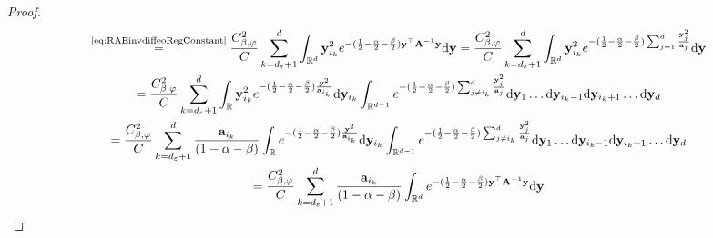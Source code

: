 \begin{proof}
\begin{multline}
        \overset{\text{\ref{eq:RAEinvdiffeoRegConstant}}}{=} \frac{\RAEdiffeoRegConstant}{\RAEnormalizationConstant} \sum_{\sumIndC=\dimInd_\RAErelerror+1}^{\dimInd} \int_{\Real^\dimInd} \VectorB_{\sumIndA_\sumIndC}^2 e^{-(\frac{1}{2} - \frac{\RAEboundParamB}{2} - \frac{\RAEboundParam}{2}) \VectorB^\top \spdMatrix^{-1} \VectorB} \mathrm{d} \VectorB = \frac{\RAEdiffeoRegConstant}{\RAEnormalizationConstant} \sum_{\sumIndC=\dimInd_\RAErelerror+1}^{\dimInd} \int_{\Real^\dimInd} \VectorB_{\sumIndA_\sumIndC}^2 e^{-(\frac{1}{2} - \frac{\RAEboundParamB}{2} - \frac{\RAEboundParam}{2}) \sum_{\sumIndB=1}^\dimInd  \frac{\VectorB_\sumIndB^2}{\spdMatrixDiag_{\sumIndB}} } \mathrm{d} \VectorB  \\
        = \frac{\RAEdiffeoRegConstant}{\RAEnormalizationConstant} \sum_{\sumIndC=\dimInd_\RAErelerror+1}^{\dimInd} \int_{\Real} \VectorB_{\sumIndA_\sumIndC}^2 e^{-(\frac{1}{2} - \frac{\RAEboundParamB}{2} - \frac{\RAEboundParam}{2})  \frac{\VectorB^2}{\spdMatrixDiag_{\sumIndA_\sumIndC}} } \mathrm{d} \VectorB_{\sumIndA_\sumIndC} \int_{\Real^{\dimInd-1}} e^{-(\frac{1}{2} - \frac{\RAEboundParamB}{2} - \frac{\RAEboundParam}{2}) \sum_{\sumIndB\neq \sumIndA_\sumIndC}^\dimInd  \frac{\VectorB_\sumIndB^2}{\spdMatrixDiag_{\sumIndB}} } \mathrm{d} \VectorB_{1} \ldots \mathrm{d} \VectorB_{\sumIndA_\sumIndC -1} \mathrm{d} \VectorB_{\sumIndA_\sumIndC +1} \ldots \mathrm{d} \VectorB_{\dimInd}\\
        = \frac{\RAEdiffeoRegConstant}{\RAEnormalizationConstant} \sum_{\sumIndC=\dimInd_\RAErelerror+1}^{\dimInd} \frac{\spdMatrixDiag_{\sumIndA_\sumIndC}}{(1 - \RAEboundParamB - \RAEboundParam)} \int_{\Real}  e^{-(\frac{1}{2} - \frac{\RAEboundParamB}{2} - \frac{\RAEboundParam}{2})  \frac{\VectorB^2}{\spdMatrixDiag_{\sumIndA_\sumIndC}} } \mathrm{d} \VectorB_{\sumIndA_\sumIndC} \int_{\Real^{\dimInd-1}} e^{-(\frac{1}{2} - \frac{\RAEboundParamB}{2} - \frac{\RAEboundParam}{2}) \sum_{\sumIndB\neq \sumIndA_\sumIndC}^\dimInd  \frac{\VectorB_\sumIndB^2}{\spdMatrixDiag_{\sumIndB}}} \mathrm{d} \VectorB_{1} \ldots \mathrm{d} \VectorB_{\sumIndA_\sumIndC -1} \mathrm{d} \VectorB_{\sumIndA_\sumIndC +1} \ldots \mathrm{d} \VectorB_{\dimInd}\\
        = \frac{\RAEdiffeoRegConstant}{\RAEnormalizationConstant} \sum_{\sumIndC=\dimInd_\RAErelerror+1}^{\dimInd} \frac{\spdMatrixDiag_{\sumIndA_\sumIndC}}{(1 - \RAEboundParamB - \RAEboundParam)} \int_{\Real^\dimInd} e^{-(\frac{1}{2} - \frac{\RAEboundParamB}{2} - \frac{\RAEboundParam}{2}) \VectorB^\top \spdMatrix^{-1} \VectorB} \mathrm{d} \VectorB \\

\end{multline}
\end{proof}
